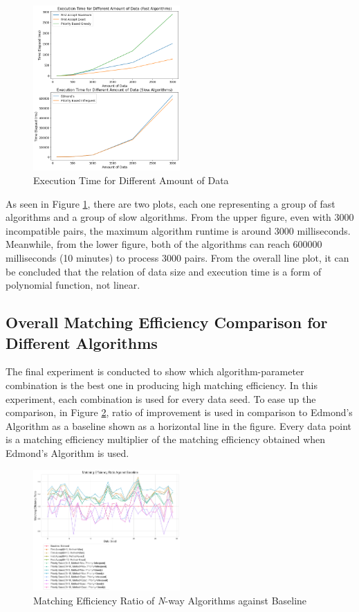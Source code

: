 \documentclass[conference]{IEEEtran}
\begin{document}
\begin{figure}[h]
    \includegraphics[width=0.5\textwidth]{images/execution_time_for_different_amount_of_data.png}
    \caption{Execution Time for Different Amount of Data}
    \label{exctimedata}
\end{figure}

As seen in Figure \ref{exctimedata}, there are two plots, each one representing a group of fast algorithms and a group of slow algorithms.
From the upper figure, even with 3000 incompatible pairs, the maximum algorithm runtime is around 3000 milliseconds. Meanwhile,
from the lower figure, both of the algorithms can reach 600000 milliseconds (10 minutes) to process 3000 pairs. From the
overall line plot, it can be concluded that the relation of data size and execution time is a form of polynomial function, not linear.

\subsection{Overall Matching Efficiency Comparison for Different Algorithms}
The final experiment is conducted to show which algorithm-parameter combination is the best one in producing high matching efficiency.
In this experiment, each combination is used for every data seed. To ease up the comparison, in Figure \ref{matcheffratio}, ratio of improvement is used
in comparison to Edmond's Algorithm as a baseline shown as a horizontal line in the figure. Every data point is a matching efficiency
multiplier of the matching efficiency obtained when Edmond's Algorithm is used.

\begin{figure}[h]
    \includegraphics[width=0.5\textwidth]{images/matching_efficiency_ratio_against_baseline.png}
    \caption{Matching Efficiency Ratio of \textit{N}-way Algorithms against Baseline}
    \label{matcheffratio}
\end{figure}
\end{document}
